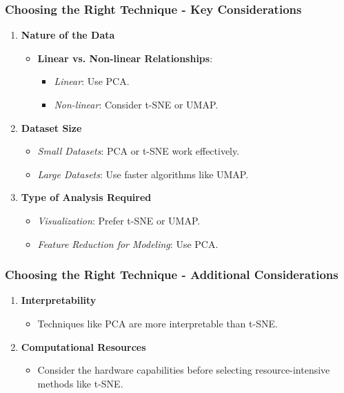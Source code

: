 \documentclass[aspectratio=169]{beamer}
\begin{document}
\begin{frame}[fragile]
    \frametitle{Choosing the Right Technique - Key Considerations}
    \begin{enumerate}
        \item \textbf{Nature of the Data}
            \begin{itemize}
                \item \textbf{Linear vs. Non-linear Relationships}:
                    \begin{itemize}
                        \item \textit{Linear}: Use PCA.
                        \item \textit{Non-linear}: Consider t-SNE or UMAP.
                    \end{itemize}
            \end{itemize}
        \item \textbf{Dataset Size}
            \begin{itemize}
                \item \textit{Small Datasets}: PCA or t-SNE work effectively.
                \item \textit{Large Datasets}: Use faster algorithms like UMAP.
            \end{itemize}
        \item \textbf{Type of Analysis Required}
            \begin{itemize}
                \item \textit{Visualization}: Prefer t-SNE or UMAP.
                \item \textit{Feature Reduction for Modeling}: Use PCA.
            \end{itemize}
    \end{enumerate}
\end{frame}

\begin{frame}[fragile]
    \frametitle{Choosing the Right Technique - Additional Considerations}
    \begin{enumerate}[resume]
        \item \textbf{Interpretability}
            \begin{itemize}
                \item Techniques like PCA are more interpretable than t-SNE.
            \end{itemize}
        \item \textbf{Computational Resources}
            \begin{itemize}
                \item Consider the hardware capabilities before selecting resource-intensive methods like t-SNE.
            \end{itemize}
    \end{enumerate}
\end{frame}
\end{document}
